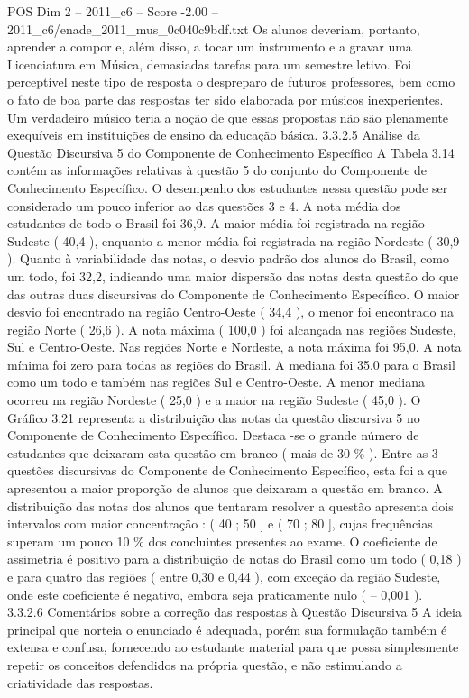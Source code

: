 \begin{textsample}{POS Dim 2 – 2011\_c6 – Score -2.00 – 2011\_c6/enade\_2011\_mus\_0c040c9bdf.txt}
Os alunos deveriam, portanto, aprender a compor e, além disso, a tocar um instrumento e a gravar uma Licenciatura em Música, demasiadas tarefas para um semestre letivo.
Foi perceptível neste tipo de resposta o despreparo de futuros professores, bem como o fato de boa parte das respostas ter sido elaborada por músicos inexperientes.
Um verdadeiro músico teria a noção de que essas propostas não são plenamente exequíveis em instituições de ensino da educação básica. 3.3.2.5 Análise da Questão Discursiva 5 do Componente de Conhecimento Específico A Tabela 3.14 contém as informações relativas à questão 5 do conjunto do Componente de Conhecimento Específico.
O desempenho dos estudantes nessa questão pode ser considerado um pouco inferior ao das questões 3 e 4.
A nota média dos estudantes de todo o Brasil foi 36,9.
A maior média foi registrada na região Sudeste ( 40,4 ), enquanto a menor média foi registrada na região Nordeste ( 30,9 ).
Quanto à variabilidade das notas, o desvio padrão dos alunos do Brasil, como um todo, foi 32,2, indicando uma maior dispersão das notas desta questão do que das outras duas discursivas do Componente de Conhecimento Específico.
O maior desvio foi encontrado na região Centro-Oeste ( 34,4 ), o menor foi encontrado na região Norte ( 26,6 ).
A nota máxima ( 100,0 ) foi alcançada nas regiões Sudeste, Sul e Centro-Oeste.
Nas regiões Norte e Nordeste, a nota máxima foi 95,0.
A nota mínima foi zero para todas as regiões do Brasil.
A mediana foi 35,0 para o Brasil como um todo e também nas regiões Sul e Centro-Oeste.
A menor mediana ocorreu na região Nordeste ( 25,0 ) e a maior na região Sudeste ( 45,0 ).
O Gráfico 3.21 representa a distribuição das notas da questão discursiva 5 no Componente de Conhecimento Específico.
Destaca -se o grande número de estudantes que deixaram esta questão em branco ( mais de 30 \% ).
Entre as 3 questões discursivas do Componente de Conhecimento Específico, esta foi a que apresentou a maior proporção de alunos que deixaram a questão em branco.
A distribuição das notas dos alunos que tentaram resolver a questão apresenta dois intervalos com maior concentração : ( 40 ; 50 ] e ( 70 ; 80 ], cujas frequências superam um pouco 10 \% dos concluintes presentes ao exame.
O coeficiente de assimetria é positivo para a distribuição de notas do Brasil como um todo ( 0,18 ) e para quatro das regiões ( entre 0,30 e 0,44 ), com exceção da região Sudeste, onde este coeficiente é negativo, embora seja praticamente nulo ( – 0,001 ). 3.3.2.6 Comentários sobre a correção das respostas à Questão Discursiva 5 A ideia principal que norteia o enunciado é adequada, porém sua formulação também é extensa e confusa, fornecendo ao estudante material para que possa simplesmente repetir os conceitos defendidos na própria questão, e não estimulando a criatividade das respostas.

\end{textsample}

